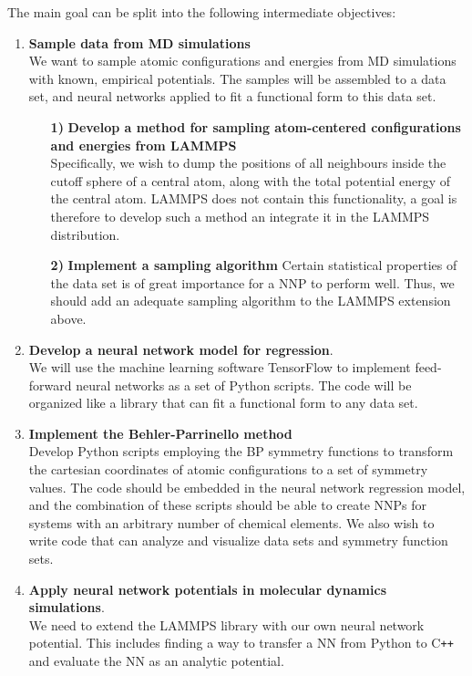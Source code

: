 \documentclass[twoside,english]{uiofysmaster}
\begin{document}
\noindent The main goal can be split into the following intermediate objectives:
\begin{enumerate}[label=\textbf{\alph*)}]
 \item \textbf{Sample data from MD simulations} \\
 We want to sample atomic configurations and energies from MD simulations with known, empirical potentials. 
 The samples will be assembled to a data set, and neural networks applied to fit a functional form to this data set. 
 \begin{enumerate}
 \item[\textbf{1)}] \textbf{Develop a method for sampling atom-centered configurations and energies from LAMMPS} \\
 Specifically, we wish to dump the positions of all neighbours inside the cutoff sphere of a central atom,  
 along with the total potential energy of the central atom. LAMMPS does not contain this functionality, a goal is therefore
 to develop such a method an integrate it in the LAMMPS distribution. 
 \item[\textbf{2)}] \textbf{Implement a sampling algorithm}
 Certain statistical properties of the data set is of great importance for a NNP to perform well. 
 Thus, we should add an adequate sampling algorithm to the LAMMPS extension above. 
 \end{enumerate}

 \item \textbf{Develop a neural network model for regression}. \\
 We will use the machine learning software TensorFlow to implement feed-forward neural networks as a set of Python scripts. 
 The code will be organized like a library that can fit a functional form to any data set. 
 
 \item \textbf{Implement the Behler-Parrinello method} \\
 Develop Python scripts employing the BP symmetry functions to transform the cartesian coordinates of atomic configurations 
 to a set of symmetry values. The code should be embedded in the neural network regression model, and the combination of these 
 scripts should be able to create NNPs for systems with an arbitrary number of chemical elements. 
 We also wish to write code that can analyze and visualize data sets and symmetry function sets. 
 
 \item \textbf{Apply neural network potentials in molecular dynamics simulations}. \\
 We need to extend the LAMMPS library with our own neural network potential. This includes finding a way 
 to transfer a NN from Python to C\texttt{++} and evaluate the NN as an analytic potential. 
 

\end{enumerate}
\end{document}
